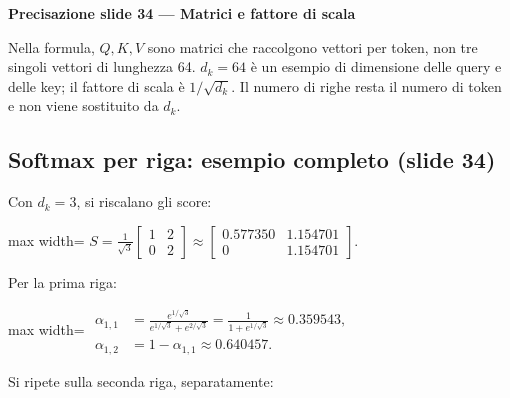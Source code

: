 \documentclass[11pt,a4paper,oneside,openany]{book}
\renewenvironment{quote}{\list{}{\leftmargin=1em\rightmargin=0pt}\item\relax}{\endlist}
\begin{document}
\begin{quote}
\textbf{Precisazione slide 34 --- Matrici e fattore di scala}
\end{quote}

\begin{quote}
Nella formula, \(Q,K,V\) sono matrici che raccolgono vettori per token, non tre singoli vettori di lunghezza 64. \(d_k=64\) è un esempio di dimensione delle query e delle key; il fattore di scala è \(1/\sqrt{d_k}\). Il numero di righe resta il numero di token e non viene sostituito da \(d_k\).
\end{quote}

\subsection{Softmax per riga: esempio completo (slide 34)}\label{f04-r660}

Con \(d_k=3\), si riscalano gli score:

\begin{center}
\begin{adjustbox}{max width=\linewidth}
$\displaystyle S=\frac1{\sqrt3}\begin{bmatrix}1&2\\0&2\end{bmatrix}
\approx\begin{bmatrix}0.577350&1.154701\\0&1.154701\end{bmatrix}.$
\end{adjustbox}
\end{center}

Per la prima riga:

\begin{center}
\begin{adjustbox}{max width=\linewidth}
$\displaystyle 
\begin{aligned}
\alpha_{1,1}
&=\frac{e^{1/\sqrt3}}{e^{1/\sqrt3}+e^{2/\sqrt3}}
=\frac1{1+e^{1/\sqrt3}}\approx0.359543,\\
\alpha_{1,2}&=1-\alpha_{1,1}\approx0.640457.
\end{aligned}
$
\end{adjustbox}
\end{center}

Si ripete sulla seconda riga, separatamente:
\end{document}
